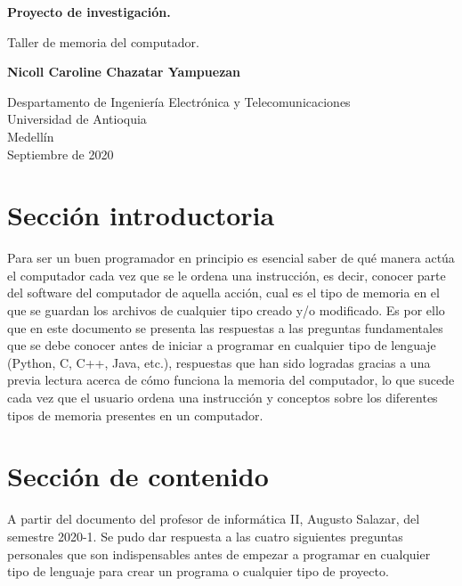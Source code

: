 \documentclass{article}
\begin{document}
\begin{titlepage}
    \begin{center}
        \vspace*{1cm}
            
        \Huge
        \textbf{Proyecto de investigación.}
            
        \vspace{0.5cm}
        \LARGE
        Taller de memoria del computador.
            
        \vspace{1.5cm}
            
        \textbf{Nicoll Caroline Chazatar Yampuezan}
            
        \vfill
            
        \vspace{0.8cm}
            
        \Large
        Despartamento de Ingeniería Electrónica y Telecomunicaciones\\
        Universidad de Antioquia\\
        Medellín\\
        Septiembre de 2020
            
    \end{center}
\end{titlepage}

\tableofcontents

\section{Sección introductoria}Para ser un buen programador en principio es esencial saber de qué manera actúa el computador cada vez que se le ordena una instrucción, es decir, conocer parte del software del computador de aquella acción, cual es el tipo de memoria en el que se guardan los archivos de cualquier tipo creado y/o modificado. Es por ello que en este documento se presenta las respuestas a las preguntas fundamentales que se debe conocer antes de iniciar a programar en cualquier tipo de lenguaje (Python, C, C++, Java, etc.), respuestas que han sido logradas gracias a una previa lectura acerca de cómo funciona la memoria del computador, lo que sucede cada vez que el usuario ordena una instrucción y conceptos sobre los diferentes tipos de memoria presentes en un computador.

\section{Sección de contenido} \label{contenido}
A partir del documento del profesor de informática II, Augusto Salazar, del semestre 2020-1. \cite{Salazar}
Se pudo dar respuesta a las cuatro siguientes preguntas  personales que son indispensables antes de empezar a programar en cualquier tipo de lenguaje para crear un programa o cualquier tipo de proyecto.
\end{document}
